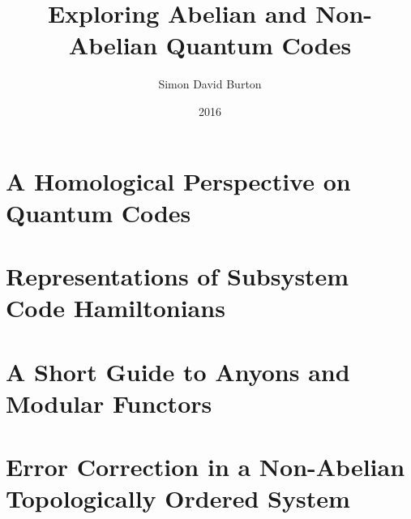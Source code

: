 \documentclass[11pt,twoside,openright]{report}
\title{Exploring Abelian and Non-Abelian Quantum Codes}
\author{Simon David Burton}
\date{2016}
\begin{document}
\maketitle


\declaration



\tableofcontents

\chapter{A Homological Perspective on Quantum Codes}





\chapter{Representations of Subsystem Code Hamiltonians}






\chapter{A Short Guide to Anyons and Modular Functors}



\chapter{Error Correction in a Non-Abelian Topologically Ordered System}





{}

\end{document}
